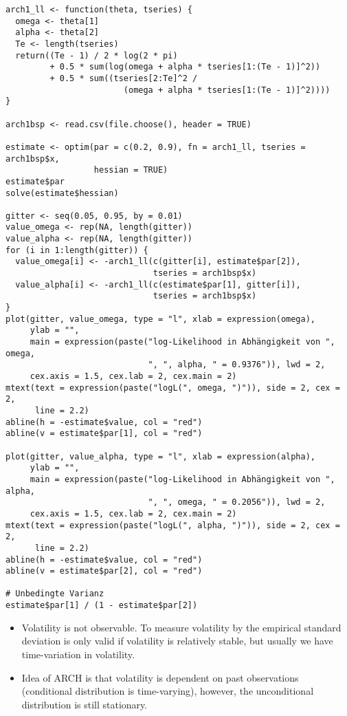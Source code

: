 \documentclass{article}
\begin{document}
\begin{solution}
\begin{verbatim}
arch1_ll <- function(theta, tseries) {
  omega <- theta[1]
  alpha <- theta[2]
  Te <- length(tseries)
  return((Te - 1) / 2 * log(2 * pi)
         + 0.5 * sum(log(omega + alpha * tseries[1:(Te - 1)]^2))
         + 0.5 * sum((tseries[2:Te]^2 /
                        (omega + alpha * tseries[1:(Te - 1)]^2))))
}

arch1bsp <- read.csv(file.choose(), header = TRUE)

estimate <- optim(par = c(0.2, 0.9), fn = arch1_ll, tseries = arch1bsp$x,
                  hessian = TRUE)
estimate$par
solve(estimate$hessian)

gitter <- seq(0.05, 0.95, by = 0.01)
value_omega <- rep(NA, length(gitter))
value_alpha <- rep(NA, length(gitter))
for (i in 1:length(gitter)) {
  value_omega[i] <- -arch1_ll(c(gitter[i], estimate$par[2]),
                              tseries = arch1bsp$x)
  value_alpha[i] <- -arch1_ll(c(estimate$par[1], gitter[i]),
                              tseries = arch1bsp$x)
}
plot(gitter, value_omega, type = "l", xlab = expression(omega),
     ylab = "",
     main = expression(paste("log-Likelihood in Abhängigkeit von ", omega,
                             ", ", alpha, " = 0.9376")), lwd = 2,
     cex.axis = 1.5, cex.lab = 2, cex.main = 2)
mtext(text = expression(paste("logL(", omega, ")")), side = 2, cex = 2,
      line = 2.2)
abline(h = -estimate$value, col = "red")
abline(v = estimate$par[1], col = "red")

plot(gitter, value_alpha, type = "l", xlab = expression(alpha),
     ylab = "",
     main = expression(paste("log-Likelihood in Abhängigkeit von ", alpha,
                             ", ", omega, " = 0.2056")), lwd = 2,
     cex.axis = 1.5, cex.lab = 2, cex.main = 2)
mtext(text = expression(paste("logL(", alpha, ")")), side = 2, cex = 2,
      line = 2.2)
abline(h = -estimate$value, col = "red")
abline(v = estimate$par[2], col = "red")

# Unbedingte Varianz
estimate$par[1] / (1 - estimate$par[2])
\end{verbatim}
\begin{itemize}
\item Volatility is not observable. To measure volatility by the empirical standard deviation is only valid if volatility is relatively stable, but usually we have time-variation in volatility.
\item Idea of ARCH is that volatility is dependent on past observations (conditional distribution is time-varying), however, the unconditional distribution is still stationary.
\end{itemize}
\end{solution}
\end{document}
